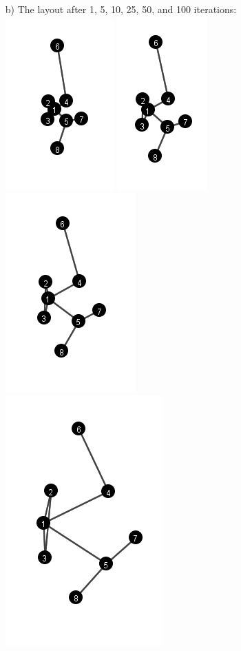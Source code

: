 \documentclass[a4paper]{article}
\begin{document}
\begin{enumerate}
	\item[b)]
	The layout after 1, 5, 10, 25, 50, and 100 iterations:\\
	\includegraphics{1.png}
	\includegraphics{5.png}
	\includegraphics{10.png}\\
	\includegraphics{25.png}\\

\end{enumerate}
\end{document}
